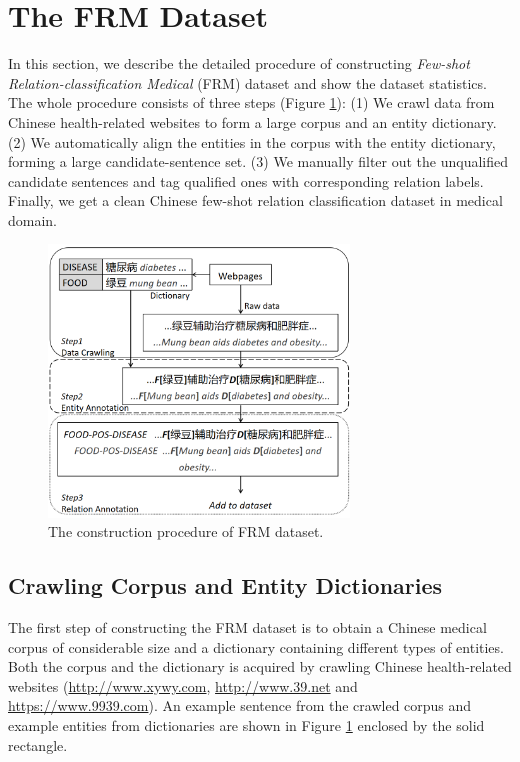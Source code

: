 \section{The FRM Dataset}
In this section, we describe the detailed procedure of constructing \emph{Few-shot Relation-classification Medical} (FRM) dataset and show the dataset statistics. The whole procedure consists of three steps (Figure \ref{fig:construct}): (1) We crawl data from Chinese health-related websites to form a large corpus and an entity dictionary. (2) We automatically align the entities in the corpus with the entity dictionary, forming a large candidate-sentence set. (3) We manually filter out the unqualified candidate sentences and tag qualified ones with corresponding relation labels. Finally, we get a clean Chinese few-shot relation classification dataset in medical domain.

\begin{figure}
    \centering
    \includegraphics[width=8cm]{datasetconstruct.png}
    \caption{The construction procedure of FRM dataset.}
    \label{fig:construct}
\end{figure}

\subsection{Crawling Corpus and Entity Dictionaries}
The first step of constructing the FRM dataset is to obtain a Chinese medical corpus of considerable size and a dictionary containing different types of entities. Both the corpus and the dictionary is acquired by crawling Chinese health-related websites (\url{http://www.xywy.com},  \url{http://www.39.net} and \url{https://www.9939.com}). An example sentence from the crawled corpus and example entities from dictionaries are shown in Figure \ref{fig:construct} enclosed by the solid rectangle.
